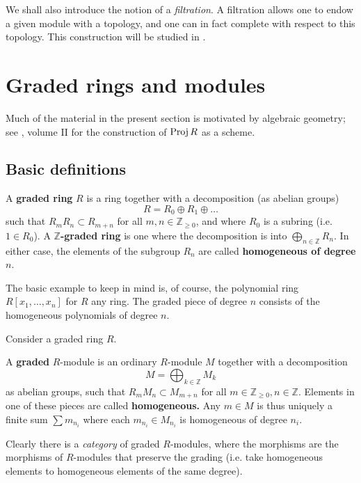 We shall also introduce the notion of a \emph{filtration}. A filtration allows
one to endow a given module with a topology, and one can in fact complete with
respect to this topology. This construction will be studied in
.

\section{Graded rings and modules}

Much of the material in the present section is motivated by algebraic
geometry; see \cite{EGA}, volume II for the construction of $\operatorname{Proj} R$ as a
scheme.

\subsection{Basic definitions}
\begin{definition} 
A \textbf{graded ring} $R$ is a ring together with a decomposition (as abelian
groups)
\[  R = R_0 \oplus R_1 \oplus \dots   \]
such that $R_m R_n \subset R_{m+n}$ for all $m, n \in \mathbb{Z}_{\geq 0}$,
and where $R_0$ is a subring (i.e. $1 \in R_0$).
A \textbf{$\mathbb{Z}$-graded ring} is one where the decomposition is into
$\bigoplus_{n \in \mathbb{Z}} R_n$.
In either case, the elements of the subgroup $R_n$ are called
\textbf{homogeneous of degree $n$}.
\end{definition}

The basic example to keep in mind is, of course, the polynomial ring $R[x_1,
\dots, x_n]$ for $R$ any ring. The graded piece of degree $n$ consists of the
homogeneous polynomials of degree $n$.

Consider a graded ring $R$.
\begin{definition} 
A \textbf{graded} $R$-module is an ordinary $R$-module $M$ together with a
decomposition
\[  M = \bigoplus_{k \in \mathbb{Z}} M_k  \]
as abelian groups, such that $R_m M_n \subset M_{m+n}$ for all $m \in
\mathbb{Z}_{\geq 0}, n \in \mathbb{Z}$. Elements in one of these pieces are
called \textbf{homogeneous.}
Any $m \in M$ is thus uniquely a finite sum $\sum m_{n_i}$ where each $m_{n_i}
\in M_{n_i}$ is homogeneous of degree $n_i$.
\end{definition} 

Clearly there is a \emph{category} of graded $R$-modules, where the morphisms
are the morphisms of $R$-modules that preserve the grading (i.e. take
homogeneous elements to homogeneous elements of the same degree).

